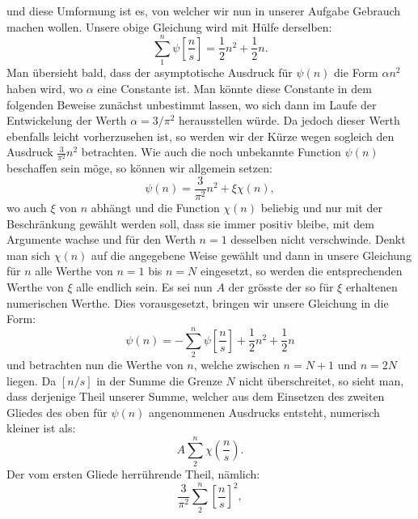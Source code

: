 \documentclass[11pt]{article}
\newcommand{\floor}[1]{\left[#1\right]}
\begin{document}
und diese Umformung ist es, von welcher wir nun in unserer Aufgabe Gebrauch machen wollen. Unsere obige Gleichung wird mit Hülfe derselben:
\[
 \sum_{1}^{n}\psi\floor{\frac ns}=\frac12 n^2+\frac12 n.
\]
Man übersieht bald, dass der asymptotische Ausdruck für $\psi(n)$ die Form $\alpha n^2$ haben wird, wo $\alpha$ eine Constante ist. Man könnte diese Constante in dem folgenden Beweise zunächst unbestimmt lassen, wo sich dann im Laufe der Entwickelung der Werth $\alpha=3/\pi^2$ herausstellen würde. Da jedoch dieser Werth ebenfalls leicht vorherzusehen ist, so werden wir der Kürze wegen sogleich den Ausdruck $\frac3{\pi^2}n^2$ betrachten. Wie auch die noch unbekannte Function $\psi(n)$ beschaffen sein möge, so können wir allgemein setzen:
\[
 \psi(n)=\frac3{\pi^2}n^2+\xi\chi(n),
\]
wo auch $\xi$ von $n$ abhängt und die Function $\chi(n)$ beliebig und nur mit der Beschränkung gewählt werden soll, dass sie immer positiv bleibe, mit dem Argumente wachse und für den Werth $n=1$ desselben nicht verschwinde. Denkt man sich $\chi(n)$ auf die angegebene Weise gewählt und dann in unsere Gleichung für $n$ alle Werthe von $n=1$ bis $n=N$ eingesetzt, so werden die entsprechenden Werthe von $\xi$ alle endlich sein. Es sei nun $A$ der grösste der so für $\xi$ erhaltenen numerischen Werthe. Dies vorausgesetzt, bringen wir unsere Gleichung in die Form:
\[
 \psi(n)=-\sum_{2}^{n}\psi\floor{\frac ns}+\frac12 n^2+\frac12 n
\]
und betrachten nun die Werthe von $n$, welche zwischen $n=N+1$ und $n=2N$ liegen. Da $\floor{n/s}$ in der Summe die Grenze $N$ nicht überschreitet, so sieht man, dass derjenige Theil unserer Summe, welcher aus dem Einsetzen des zweiten Gliedes des oben für $\psi(n)$ angenommenen Ausdrucks entsteht, numerisch kleiner ist als:
\[
 A\sum_{2}^{n}\chi\left(\frac ns\right).
\]
Der vom ersten Gliede herrührende Theil, nämlich:
\[
 \frac3{\pi^2}\sum_{2}^{n}\floor{\frac ns}^{2},
\]
\end{document}
